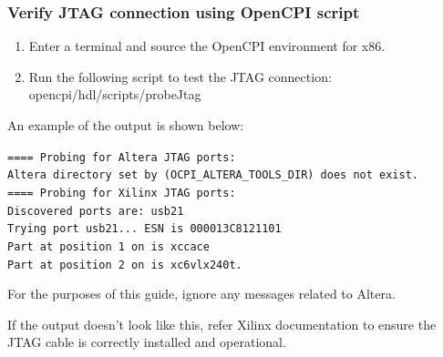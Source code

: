 \documentclass{article}
\newcommand{\terminaloutput}[1]{\texttt{#1}}
\begin{document}
\subsubsection*{Verify JTAG connection using OpenCPI script}
\begin{enumerate}
\item Enter a terminal and source the OpenCPI environment for x86.
\item Run the following script to test the JTAG connection: opencpi/hdl/scripts/probeJtag
\end{enumerate}
\par\smallskip
\noindent An example of the output is shown below:\par\smallskip
\noindent\terminaloutput{==== Probing for Altera JTAG ports:\\
Altera directory set by (OCPI\_ALTERA\_TOOLS\_DIR) does not exist.\\==== Probing for Xilinx JTAG ports:\\Discovered ports are: usb21\\Trying port usb21...  ESN is 000013C8121101\\Part at position 1 on is xccace\\Part at position 2 on is xc6vlx240t.}\par\bigskip
\noindent For the purposes of this guide, ignore any messages related to Altera.\par\smallskip
\noindent If the output doesn't look like this, refer Xilinx documentation to ensure the JTAG cable is correctly installed and operational.\par\smallskip
\end{document}
